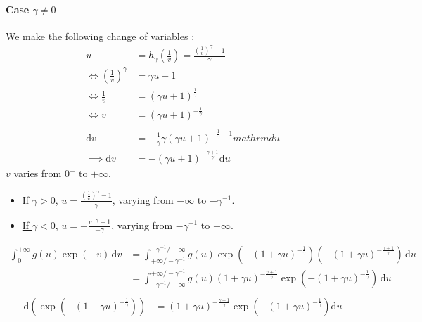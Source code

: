 \paragraph{Case $\gamma \ne 0$} We make the following change of variables :
\begin{equation}
\begin{alignat*}{2}
u &= h_\gamma(\frac{1}{v}) = \frac{(\frac{1}{v})^\gamma - 1}{\gamma}\\
\iff (\frac{1}{v})^\gamma &= \gamma u + 1\\
\iff \frac{1}{v} &= (\gamma u + 1)^{\frac{1}{\gamma}} \\
\iff v &= (\gamma u + 1)^{- \frac{1}{\gamma}} \\ \\
\mathrm{d}v &= - \frac{1}{\gamma} \gamma (\gamma u + 1)^{- \frac{1}{\gamma} - 1} mathrm{d}u \\
\implies \mathrm{d}v &= - (\gamma u + 1)^{- \frac{\gamma + 1}{\gamma}} \mathrm{d}u
\end{alignat*}
\end{equation} $v$ varies from $0^+$ to $+ \infty$,
\begin{itemize}
	\item \underline{If $\gamma > 0$}, $u = \frac{(\frac{1}{v})^\gamma - 1}{\gamma}$, varying from $- \infty$ to $- \gamma^{-1}$.
	\item \underline{If $\gamma < 0$}, $u = - \frac{v^{- \gamma} + 1}{- \gamma}$, varying from $- \gamma^{-1}$ to $- \infty$.
\end{itemize}
\begin{equation}
\begin{alignat*}{2}
 \int_0^{+ \infty} \! g(u) \exp(- v)\, \mathrm{d}v &=  \int_{+ \infty / - \gamma^{-1}}^{- \gamma^{-1} / - \infty} \! g(u) \exp(- (1 + \gamma u)^{- \frac{1}{\gamma}}) (- (1 + \gamma u)^{- \frac{\gamma + 1}{\gamma}})\, \mathrm{d}u \\
 &=  \int_{ - \gamma^{-1} / - \infty}^{+ \infty / - \gamma^{-1}} \! g(u) (1 + \gamma u)^{- \frac{\gamma + 1}{\gamma}} \exp(- (1 + \gamma u)^{- \frac{1}{\gamma}})  \, \mathrm{d}u \\
\end{alignat*}
\end{equation}
\begin{equation}
\begin{alignat*}{2}
\mathrm{d}(\exp(- (1 + \gamma u)^{- \frac{1}{\gamma}})) &=  (1 + \gamma u)^{- \frac{\gamma + 1}{\gamma}} \exp(- (1 + \gamma u)^{- \frac{1}{\gamma}}) \mathrm{d}u
\end{alignat*}
\end{equation}
